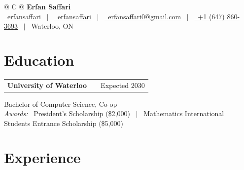 \documentclass[a4paper,10.5pt]{article}
\begin{document}
\pagestyle{empty}


\begin{tabularx}{\linewidth}{@{} C @{}}
\Huge{\textbf{Erfan Saffari}} \\[6pt]
\href{https://github.com/erfansaffari}{\raisebox{-0.05\height}\faGithub\ erfansaffari} \ $|$ \
\href{https://linkedin.com/in/erfansaffari}{\raisebox{-0.05\height}\faLinkedin\ erfansaffari} \ $|$ \
\href{mailto:erfansaffari0@gmail.com}{\raisebox{-0.05\height}\faEnvelope\ erfansaffari0@gmail.com} \ $|$ \
\href{tel:+16478603693}{\raisebox{-0.05\height}\faMobile\ +1 (647) 860-3693} \ $|$ \
Waterloo, ON
\end{tabularx}


\section{Education}

\begin{tabularx}{\linewidth}{@{}l X r@{}}
\textbf{University of Waterloo} & & Expected 2030 \\
\end{tabularx}
Bachelor of Computer Science, Co-op \\[2pt]
\textit{Awards:} \ President's Scholarship (\$2,000) \ $|$ \ Mathematics International Students Entrance Scholarship (\$5,000)


\section{Experience}
\end{document}
